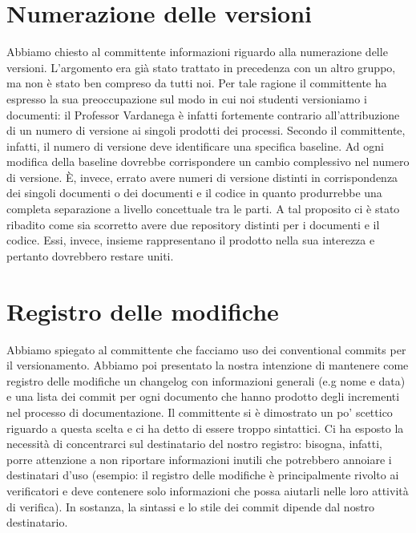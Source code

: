 \documentclass{article}
\begin{document}
\section{Numerazione delle versioni}%
\label{sec:numerazione_delle_versioni}

Abbiamo chiesto al committente informazioni riguardo alla numerazione delle versioni. L'argomento era già stato trattato in precedenza con un altro gruppo, ma non è stato ben compreso da tutti noi. Per tale ragione il committente ha espresso la sua preoccupazione sul modo in cui noi studenti versioniamo i documenti: il Professor Vardanega è infatti fortemente contrario all'attribuzione di un numero di versione ai singoli prodotti dei processi. Secondo il committente, infatti, il numero di versione deve identificare una specifica baseline. Ad ogni modifica della baseline dovrebbe corrispondere un cambio complessivo nel numero di versione. È, invece, errato  avere numeri di versione distinti in corrispondenza dei singoli documenti o dei documenti e il codice in quanto produrrebbe una completa separazione a livello concettuale tra le parti. A tal proposito ci è stato ribadito come sia scorretto avere due repository distinti per i documenti e il codice. Essi, invece, insieme rappresentano il prodotto nella sua interezza e pertanto dovrebbero restare uniti.

\section{Registro delle modifiche}%
\label{sec:registro_delle_modifiche}

Abbiamo spiegato al committente che facciamo uso dei conventional commits per il versionamento. Abbiamo poi presentato la nostra intenzione di mantenere come registro delle modifiche un changelog con informazioni generali (e.g nome e data) e una lista dei commit per ogni documento che hanno prodotto degli incrementi nel processo di documentazione. Il committente si è dimostrato un po' scettico riguardo a questa scelta e ci ha detto di essere troppo sintattici. Ci ha esposto la necessità di concentrarci sul destinatario del nostro registro: bisogna, infatti, porre attenzione a non riportare informazioni inutili che potrebbero annoiare i destinatari d'uso (esempio: il registro delle modifiche è principalmente rivolto ai verificatori e deve contenere solo informazioni che possa aiutarli nelle loro attività di verifica). In sostanza, la sintassi e lo stile dei commit dipende dal nostro destinatario.
\end{document}
